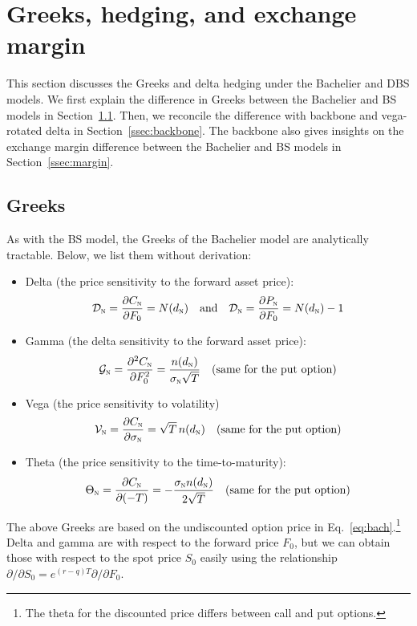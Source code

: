 \documentclass[a4paper,review]{elsarticle}
\newcommand{\qtext}[2][\quad]{#1\text{#2}#1}
\newcommand{\sigman}{\sigma_\textsc{n}}
\newcommand{\norm}{\textsc{n}}
\begin{document}
\section{Greeks, hedging, and exchange margin} \label{sec:greeks} \noindent 
This section discusses the Greeks and delta hedging under the Bachelier and DBS models. We first explain the difference in Greeks between the Bachelier and BS models in Section~\ref{ssec:greeks}. Then, we reconcile the difference with backbone and vega-rotated delta in Section~\ref{ssec:backbone}. The backbone also gives insights on the exchange margin difference between the Bachelier and BS models in Section~\ref{ssec:margin}.

\subsection{Greeks} \label{ssec:greeks} \noindent
As with the BS model, the Greeks of the Bachelier model are analytically tractable. Below, we list them without derivation:
\begin{itemize}
	\item Delta (the price sensitivity to the forward asset price):
	$$ \mathcal{D}_\norm = \frac{\partial C_\norm}{\partial F_0} = N(d_\norm) \qtext{and}
	\mathcal{D}_\norm = \frac{\partial P_\norm}{\partial F_0} = N(d_\norm)-1
$$
	\item Gamma (the delta sensitivity to the forward asset price):
	$$ \mathcal{G}_\norm = \frac{\partial^2 C_\norm}{\partial F_0^2} = \frac{n(d_\norm)}{\sigman \sqrt{T}} \quad \text{(same for the put option)}$$
	\item Vega (the price sensitivity to volatility)
	$$ \mathcal{V}_\norm = \frac{\partial C_\norm}{\partial \sigman} = \sqrt{T}\,n(d_\norm) \quad \text{(same for the put option)}$$
	\item Theta (the price sensitivity to the time-to-maturity):
	$$ \Theta_\norm = \frac{\partial C_\norm}{\partial(-T)} = -\frac{\sigman n(d_\norm)}{2\sqrt{T}} \quad \text{(same for the put option)}$$
\end{itemize}
The above Greeks are based on the undiscounted option price in Eq.~\eqref{eq:bach}.\footnote{The theta for the discounted price differs between call and put options.} Delta and gamma are with respect to the forward price $F_0$, but we can obtain those with respect to the spot price $S_0$ easily using the relationship $\partial/\partial S_0 = e^{(r-q)T} \partial/\partial F_0$.
\end{document}
